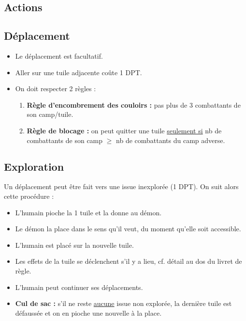 \documentclass[10pt, a4paper]{article}	%
\begin{document}
\begin{multicols}{3}
\section{Actions}

\subsection{Déplacement}
\begin{itemize}
\item Le déplacement est facultatif.
\item Aller sur une tuile adjacente coûte 1 DPT.
\item On doit respecter 2 règles :
\begin{enumerate}
	\item \textbf{Règle d'encombrement des couloirs :} pas plus de 3 combattants de son camp/tuile.
	\item \textbf{Règle de blocage :} on peut quitter une tuile \underline{seulement si} nb de combattants de son camp $\geqslant$ nb de combattants du camp adverse.
\end{enumerate}
\end{itemize}


\subsection{Exploration}
Un déplacement peut être fait vers une issue inexplorée (1 DPT). On suit alors cette procédure :
\begin{itemize}
\item L'humain pioche la 1\iere{} tuile et la donne au démon.
\item Le démon la place dans le sens qu'il veut, du moment qu'elle soit accessible.
\item L'humain est placé sur la nouvelle tuile.
\item Les effets de la tuile se déclenchent s'il y a lieu, cf. détail au dos du livret de règle.
\item L'humain peut continuer ses déplacements.
\item \textbf{Cul de sac :} s'il ne reste \underline{aucune} issue non explorée, la dernière tuile est défaussée et on en pioche une nouvelle à la place.
\end{itemize}



\end{multicols}
\end{document}
